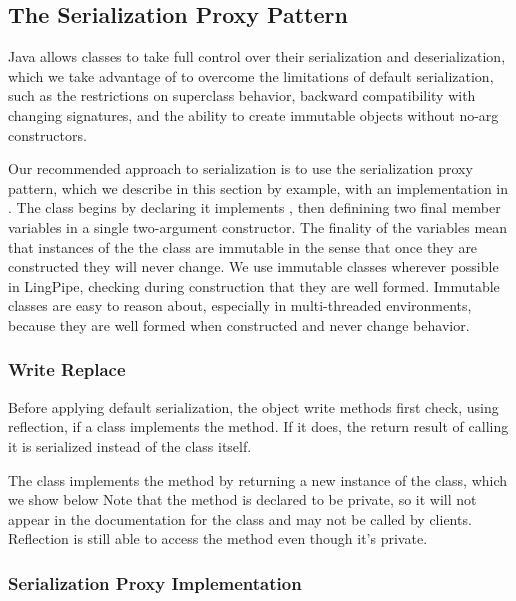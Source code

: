 \subsection{The Serialization Proxy Pattern}

Java allows classes to take full control over their serialization and
deserialization, which we take advantage of to overcome the
limitations of default serialization, such as the restrictions on
superclass behavior, backward compatibility with changing signatures,
and the ability to create immutable objects without no-arg constructors.

Our recommended approach to serialization is to use the serialization
proxy pattern, which we describe in this section by example, with an
implementation in .  The class begins by declaring
it implements , then definining two final member
variables in a single two-argument constructor.  
%
%
The finality of the variables mean that instances of the the class are
immutable in the sense that once they are constructed they will never
change.  We use immutable classes wherever possible in LingPipe,
checking during construction that they are well formed.  Immutable
classes are easy to reason about, especially in multi-threaded
environments, because they are well formed when constructed and never
change behavior.

\subsubsection{Write Replace}

Before applying default serialization, the object write methods first
check, using reflection, if a class implements the
 method.  If it does, the return result of
calling it is serialized instead of the class itself.  

The  class implements the 
method by returning a new instance of the  class,
which we show below
%
%
Note that the method is declared to be private, so it will not appear
in the documentation for the class and may not be called by clients.
Reflection is still able to access the method even though it's
private. 

\subsubsection{Serialization Proxy Implementation}


